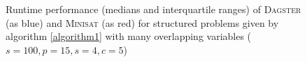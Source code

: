 \begin{figure}[]
		\caption[Runtime performance for random structured problems with many overlapping variables]{Runtime performance (medians and interquartile ranges) of \textsc{Dagster} (as blue) and \textsc{Minisat} (as red) for structured problems given by algorithm \ref{algorithm1} with many overlapping variables ($s=100,p=15,s=4,c=5$)}
		\label{fig:performance_graph2}
    \end{figure}
